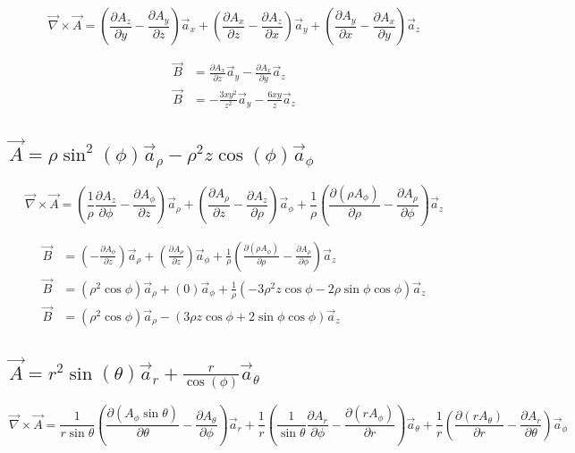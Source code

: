 \documentclass[14pt]{extarticle}
\begin{document}
\[
	\vec{\nabla}\times\vec{A}=
	\left(\frac{\partial A_z}{\partial y}-\frac{\partial A_y}{\partial z}\right)\vec{a}_x+
	\left(\frac{\partial A_x}{\partial z}-\frac{\partial A_z}{\partial x}\right)\vec{a}_y+
	\left(\frac{\partial A_y}{\partial x}-\frac{\partial A_x}{\partial y}\right)\vec{a}_z
\]

\begin{align*}
	\vec{B} & =
	\frac{\partial A_x}{\partial z}\vec{a}_y-
	\frac{\partial A_x}{\partial y}\vec{a}_z \\
	\vec{B} & =
	-\frac{3xy^2}{z^2}\vec{a}_y-\frac{6xy}{z}\vec{a}_z
\end{align*}

\boldmath
\subsection{$\vec{A}=\rho\sin^2(\phi)\vec{a}_\rho-\rho^2z\cos(\phi)\vec{a}_\phi$}
\unboldmath

\[
	\vec{\nabla}\times\vec{A}=
	\left(\frac1\rho\frac{\partial A_z}{\partial \phi}-\frac{\partial A_\phi}{\partial z}\right)\vec{a}_\rho+
	\left(\frac{\partial A_\rho}{\partial z}-\frac{\partial A_z}{\partial \rho}\right)\vec{a}_\phi+
	\frac1\rho\left(\frac{\partial (\rho A_\phi)}{\partial \rho}-\frac{\partial A_\rho}{\partial \phi}\right)\vec{a}_z
\]

\begin{align*}
	\vec{B} & =
	\left(-\frac{\partial A_\phi}{\partial z}\right)\vec{a}_\rho+
	\left(\frac{\partial A_\rho}{\partial z}\right)\vec{a}_\phi+
	\frac1\rho\left(\frac{\partial (\rho A_\phi)}{\partial \rho}-\frac{\partial A_\rho}{\partial \phi}\right)\vec{a}_z \\
	\vec{B} & =
	\left(\rho^2\cos{\phi}\right)\vec{a}_\rho+
	(0)\vec{a}_\phi+
	\frac1\rho\left(-3\rho^2z\cos{\phi}-2\rho\sin\phi\cos\phi\right)\vec{a}_z                                          \\
	\vec{B} & =
	\left(\rho^2\cos{\phi}\right)\vec{a}_\rho-
	\left(3\rho z\cos{\phi}+2\sin\phi\cos\phi\right)\vec{a}_z
\end{align*}

\boldmath
\subsection{$\vec{A}=r^2\sin(\theta)\vec{a}_r+\frac{r}{\cos(\phi)}\vec{a}_\theta$}
\unboldmath

\[
	\vec{\nabla}\times\vec{A}=
	\frac{1}{r\sin{\theta}}\left(\frac{\partial (A_\phi\sin{\theta})}{\partial \theta}-\frac{\partial A_\theta}{\partial \phi}\right)\vec{a}_r+
	\frac1r\left(\frac{1}{\sin{\theta}}\frac{\partial A_r}{\partial \phi}-\frac{\partial (rA_\phi)}{\partial r}\right)\vec{a}_\theta+
	\frac1r\left(\frac{\partial (rA_\theta)}{\partial r}-\frac{\partial A_r}{\partial \theta}\right)\vec{a}_\phi
\]
\end{document}
